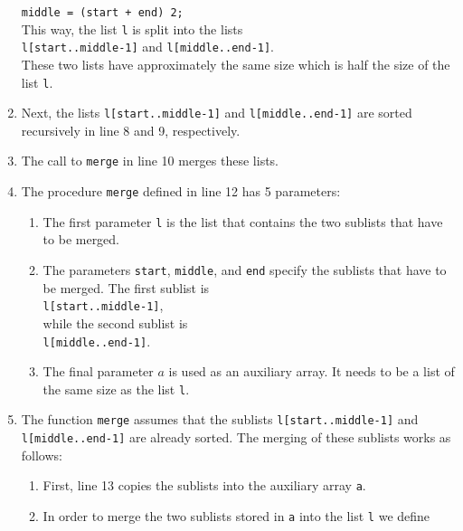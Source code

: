 \begin{enumerate}
      \texttt{middle = (start + end)  2;} 
      \\[0.2cm]
      This way, the list \texttt{l} is split into the lists 
      \\[0.2cm]
      \hspace*{1.3cm}
      \texttt{l[start..middle-1]} \quad and \quad \texttt{l[middle..end-1]}.
      \\[0.2cm]
      These two lists have approximately the same size which is half the size of the list \texttt{l}.
\item Next, the lists \texttt{l[start..middle-1]} and \texttt{l[middle..end-1]} are sorted
      recursively in line 8 and 9, respectively.
\item The call to \texttt{merge} in line 10 merges these lists.
\item The procedure \texttt{merge} defined in line 12 has 5 parameters: 
      \begin{enumerate}
      \item The first parameter \texttt{l} is the list that contains the two sublists that have to be merged.
      \item The parameters \texttt{start}, \texttt{middle}, and \texttt{end} specify the sublists
            that have to be merged.  The first sublist is 
            \\[0.2cm]
            \hspace*{1.3cm} 
            \texttt{l[start..middle-1]}, 
            \\[0.2cm]
            while the second sublist is \\[0.2cm]
            \hspace*{1.3cm} 
            \texttt{l[middle..end-1]}. 
      \item The final parameter $a$ is used as an auxiliary array.  It needs to be a list of the
            same size as the list \texttt{l}.
      \end{enumerate}
\item The function \texttt{merge} assumes that the sublists \texttt{l[start..middle-1]} and \linebreak
      \texttt{l[middle..end-1]} are already sorted.  The merging of these sublists works as follows:
      \begin{enumerate}
      \item First, line 13 copies the sublists into the auxiliary array \texttt{a}.
      \item In order to merge the two sublists stored in \texttt{a} into the list \texttt{l} we define

\end{enumerate}
\end{enumerate}

